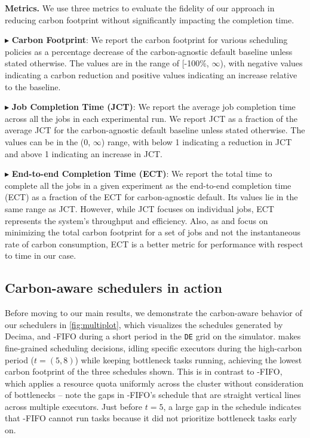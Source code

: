 \vspace{0.05cm}
\noindent 
\textbf{Metrics.} We use three metrics to evaluate the fidelity of our approach in reducing carbon footprint without significantly impacting the completion time. 

\vspace{0.05cm}
$\blacktriangleright$ \textbf{Carbon Footprint}: 
We report the carbon footprint for various scheduling policies as a percentage decrease of the carbon-agnostic default baseline unless stated otherwise. 
The values are in the range of [-100\%, $\infty$), with negative values indicating a carbon reduction and positive values indicating an increase relative to the baseline. 
 
$\blacktriangleright$ \textbf{Job Completion Time (JCT)}:
We report the average job completion time across all the jobs in each experimental run. 
We report JCT as a fraction of the average JCT for the carbon-agnostic default baseline unless stated otherwise. 
The values can be in the (0, $\infty$) range, with below 1 indicating a reduction in JCT and above 1 indicating an increase in JCT.

$\blacktriangleright$ \textbf{End-to-end Completion Time (ECT)}:
We report the total time to complete all the jobs in a given experiment as the end-to-end completion time (ECT) as a fraction of the ECT for carbon-agnostic default. 
Its values lie in the same range as JCT. 
However, while JCT focuses on individual jobs, ECT represents the system's throughput and efficiency. 
Also, as \DANISH and \CAP focus on minimizing the total carbon footprint for a set of jobs and not the instantaneous rate of carbon consumption, ECT is a better metric for performance with respect to time in our case.

\subsection{Carbon-aware schedulers in action} \label{sec:in-action}

Before moving to our main results, we demonstrate the carbon-aware behavior of our schedulers in \autoref{fig:multiplot}, which visualizes the schedules generated by Decima, \PCAPS and \CAP-FIFO during a short period in the \verb|DE| grid on the simulator.
\PCAPS makes fine-grained scheduling decisions, idling specific executors during the high-carbon period ($t = (5,8)$) while keeping bottleneck tasks running, achieving the lowest carbon footprint of the three schedules shown.  This is in contrast to \CAP-FIFO, which applies a resource quota uniformly across the cluster without consideration of bottlenecks -- note the gaps in \CAP-FIFO's schedule that are straight vertical lines across multiple executors.  Just before $t = 5$, a large gap in the schedule indicates that \CAP-FIFO cannot run tasks because it did not prioritize bottleneck tasks early on.


